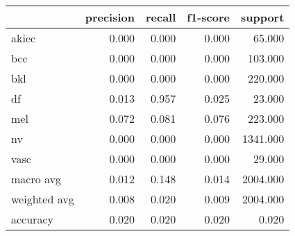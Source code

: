 \begin{tabular}{lrrrr}
\toprule
 & precision & recall & f1-score & support \\
\midrule
akiec & 0.000 & 0.000 & 0.000 & 65.000 \\
bcc & 0.000 & 0.000 & 0.000 & 103.000 \\
bkl & 0.000 & 0.000 & 0.000 & 220.000 \\
df & 0.013 & 0.957 & 0.025 & 23.000 \\
mel & 0.072 & 0.081 & 0.076 & 223.000 \\
nv & 0.000 & 0.000 & 0.000 & 1341.000 \\
vasc & 0.000 & 0.000 & 0.000 & 29.000 \\
macro avg & 0.012 & 0.148 & 0.014 & 2004.000 \\
weighted avg & 0.008 & 0.020 & 0.009 & 2004.000 \\
accuracy & 0.020 & 0.020 & 0.020 & 0.020 \\
\bottomrule
\end{tabular}
